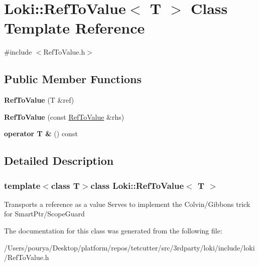 \hypertarget{classLoki_1_1RefToValue}{}\section{Loki\+:\+:Ref\+To\+Value$<$ T $>$ Class Template Reference}
\label{classLoki_1_1RefToValue}


{\ttfamily \#include $<$Ref\+To\+Value.\+h$>$}

\subsection*{Public Member Functions}
\begin{DoxyCompactItemize}
\item 
\hypertarget{classLoki_1_1RefToValue_aab46997dd1a09bb25804143fa45995a6}{}{\bfseries Ref\+To\+Value} (T \&ref)\label{classLoki_1_1RefToValue_aab46997dd1a09bb25804143fa45995a6}

\item 
\hypertarget{classLoki_1_1RefToValue_a55a9c48af060dcd7eb3047543cc011eb}{}{\bfseries Ref\+To\+Value} (const \hyperlink{classLoki_1_1RefToValue}{Ref\+To\+Value} \&rhs)\label{classLoki_1_1RefToValue_a55a9c48af060dcd7eb3047543cc011eb}

\item 
\hypertarget{classLoki_1_1RefToValue_a8b781abcf29ab6c76e22ad8e46a9ae20}{}{\bfseries operator T \&} () const \label{classLoki_1_1RefToValue_a8b781abcf29ab6c76e22ad8e46a9ae20}

\end{DoxyCompactItemize}


\subsection{Detailed Description}
\subsubsection*{template$<$class T$>$class Loki\+::\+Ref\+To\+Value$<$ T $>$}

Transports a reference as a value Serves to implement the Colvin/\+Gibbons trick for Smart\+Ptr/\+Scope\+Guard 

The documentation for this class was generated from the following file\+:\begin{DoxyCompactItemize}
\item 
/\+Users/pourya/\+Desktop/platform/repos/tetcutter/src/3rdparty/loki/include/loki/Ref\+To\+Value.\+h\end{DoxyCompactItemize}
